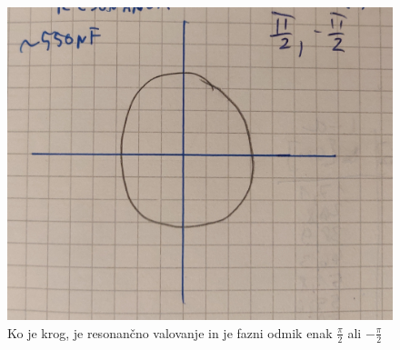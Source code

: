\documentclass[a4paper]{report}
\begin{document}
\begin{figure}[htp]
    \centering
    \includegraphics[width=\textwidth]{Lisajeva krog.png}
    \caption{Ko je krog, je resonančno valovanje in je fazni odmik enak $\frac{\pi}{2}$ ali $-\frac{\pi}{2}$}
    \label{fig:galaxy}
\end{figure}
\end{document}
